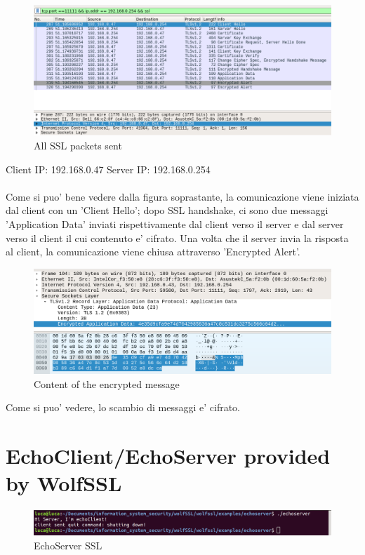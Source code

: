 \documentclass[a4paper,12pt]{report}
\begin{document}
\begin{figure}[H]
    \centering
    \includegraphics[scale=0.5]{test/examples/client-server/wireshark1.png}
    \caption{All SSL packets sent}
    \label{fig:galaxy}
\end{figure}
Client IP:  192.168.0.47 \hspace{4cm} Server IP: 192.168.0.254\\ \\
Come si puo' bene vedere dalla figura soprastante, la comunicazione viene iniziata dal client con un 'Client Hello'; dopo SSL handshake, ci sono due messaggi 'Application Data' inviati rispettivamente dal client verso il server e dal server verso il client il cui contenuto e' cifrato. Una volta che il server invia la risposta al client, la comunicazione viene chiusa attraverso 'Encrypted Alert'.

\begin{figure}[H]
    \centering
    \includegraphics[scale=0.3]{test/examples/client-server/encrypted_data.png}
    \caption{Content of the encrypted message}
    \label{fig:galaxy}
\end{figure}

Come si puo' vedere, lo scambio di messaggi e' cifrato.


\pagebreak

\section{EchoClient/EchoServer provided by WolfSSL}
\begin{figure}[H]
\hspace*{-1cm}     
    \centering
    \includegraphics[scale=0.25]{test/examples/echoclient-echoserver/echoServer.png}
    \caption{EchoServer SSL}
    \label{fig:galaxy}
\end{figure}
\end{document}
